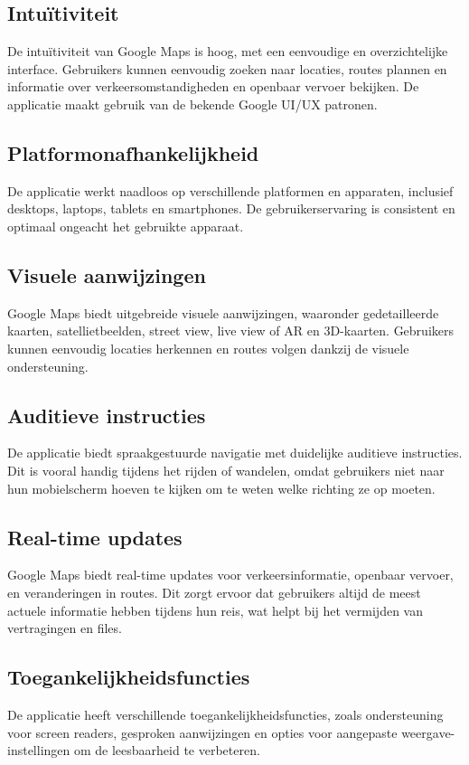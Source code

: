 \subsection*{Intuïtiviteit}
De intuïtiviteit van Google Maps is hoog, met een eenvoudige en overzichtelijke interface. Gebruikers kunnen eenvoudig zoeken naar locaties, routes plannen en informatie over verkeersomstandigheden en openbaar vervoer bekijken. De applicatie maakt gebruik van de bekende Google UI/UX patronen.


\subsection*{Platformonafhankelijkheid}
De applicatie werkt naadloos op verschillende platformen en apparaten, inclusief desktops, laptops, tablets en smartphones. De gebruikerservaring is consistent en optimaal ongeacht het gebruikte apparaat.

\subsection*{Visuele aanwijzingen}
Google Maps biedt uitgebreide visuele aanwijzingen, waaronder gedetailleerde kaarten, satellietbeelden, street view, live view of AR en 3D-kaarten. Gebruikers kunnen eenvoudig locaties herkennen en routes volgen dankzij de visuele ondersteuning.

\subsection*{Auditieve instructies}
De applicatie biedt spraakgestuurde navigatie met duidelijke auditieve instructies. Dit is vooral handig tijdens het rijden of wandelen, omdat gebruikers niet naar hun mobielscherm hoeven te kijken om te weten welke richting ze op moeten.

\subsection*{Real-time updates}
Google Maps biedt real-time updates voor verkeersinformatie, openbaar vervoer, en veranderingen in routes. Dit zorgt ervoor dat gebruikers altijd de meest actuele informatie hebben tijdens hun reis, wat helpt bij het vermijden van vertragingen en files.

\subsection*{Toegankelijkheidsfuncties}
De applicatie heeft verschillende toegankelijkheidsfuncties, zoals ondersteuning voor screen readers, gesproken aanwijzingen en opties voor aangepaste weergave-instellingen om de leesbaarheid te verbeteren.

